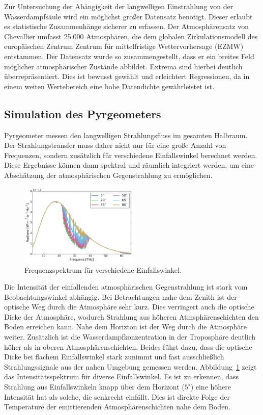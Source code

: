 \documentclass[10pt,a4paper,compsoc,peer review papers]{IEEEtran}
\begin{document}
Zur Untersuchung der Abängigkeit der langwelligen Einstrahlung von der
Wasserdampfsäule wird ein möglichst großer Datensatz benötigt. Dieser erlaubt
es statistische Zusammenhänge sicherer zu erfassen. Der Atmosphärensatz von
Chevallier \cite{Chevallier2006} umfasst 25.000 Atmosphären, die dem globalen
Zirkulationsmodell des europäischen Zentrum Zentrum für mittelfristige
Wettervorhersage (EZMW) entstammen. Der Datensatz wurde so
zusammengestellt, dass er ein breites Feld möglicher atmosphärischer Zustände
abbildet. Extrema sind hierbei deutlich überrepräsentiert. Dies ist bewusst
gewählt und erleichtert Regressionen, da in einem weiten Wertebereich
eine hohe Datendichte gewährleistet ist.

\subsection{Simulation des Pyrgeometers}\label{subsec:simulation_pyrgeometer}
Pyrgeometer messen den langwelligen Strahlungsfluss im gesamten Halbraum. Der
Strahlungstransfer muss daher nicht nur für eine große Anzahl von Frequenzen,
sondern zusätzlich für verschiedene Einfallswinkel berechnet werden. Diese
Ergebnisse können dann spektral und räumlich integriert werden, um eine
Abschätzung der atmosphärischen Gegenstrahlung zu ermöglichen.

\begin{figure}[ht]
  \centering
  \includegraphics[width=0.5\textwidth]{figures/lwr_spectrum_elevation.pdf}
  \caption{Frequenzspektrum für verschiedene Einfallswinkel.}
  \label{fig:spectrum_elevation}
\end{figure}

Die Intensität der einfallenden atmosphärischen Gegenstrahlung ist stark vom
Beobachtungswinkel abhängig. Bei Betrachtungen nahe dem Zenith ist der optische
Weg durch die Atmosphäre sehr kurz. Dies verringert auch die optische Dicke der
Atmosphäre, wodurch Strahlung aus höheren Atmsphärenschichten den Boden
erreichen kann. Nahe dem Horizton ist der Weg durch die Atmosphäre weiter.
Zusätzlich ist die Wasserdampfkonzentration in der Troposphäre deutlich höher
als in oberen Atmosphärenschichten. Beides führt dazu, dass die optische Dicke
bei flachem Einfallswinkel stark zunimmt und fast ausschließlich
Strahlungssignale aus der nahen Umgebung gemessen werden.
Abbildung~\ref{fig:spectrum_elevation} zeigt das Intensitätsspektrum für
diverse Einfallswinkel. Es ist zu erkennen, dass Strahlung aus Einfallswinkeln
knapp über dem Horizont ($5^\circ$) eine höhere Intensität hat als solche, die
senkrecht einfällt. Dies ist direkte Folge der Temperature der emittierenden
Atmosphärenschichten nahe dem Boden.
\end{document}
